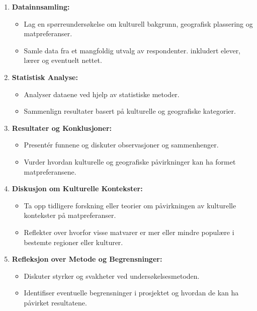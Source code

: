 \documentclass{article}
\begin{document}
\begin{enumerate}[label=\arabic*.]
  \item \textbf{Datainnsamling:}
  \begin{itemize}
    \item Lag en spørreundersøkelse om kulturell bakgrunn, geografisk plassering og matpreferanser.
    \item Samle data fra et mangfoldig utvalg av respondenter. inkludert elever, lærer og eventuelt nettet.
  \end{itemize}
  
  \item \textbf{Statistisk Analyse:}
  \begin{itemize}
    \item Analyser dataene ved hjelp av statistiske metoder.
    \item Sammenlign resultater basert på kulturelle og geografiske kategorier.
  \end{itemize}
  
  \item \textbf{Resultater og Konklusjoner:}
  \begin{itemize}
    \item Presentér funnene og diskuter observasjoner og sammenhenger.
    \item Vurder hvordan kulturelle og geografiske påvirkninger kan ha formet matpreferansene.
  \end{itemize}
  
  \item \textbf{Diskusjon om Kulturelle Kontekster:}
  \begin{itemize}
    \item Ta opp tidligere forskning eller teorier om påvirkningen av kulturelle kontekster på matpreferanser.
    \item Reflekter over hvorfor visse matvarer er mer eller mindre populære i bestemte regioner eller kulturer.
  \end{itemize}
  
  \item \textbf{Refleksjon over Metode og Begrensninger:}
  \begin{itemize}
    \item Diskuter styrker og svakheter ved undersøkelsesmetoden.
    \item Identifiser eventuelle begrensninger i prosjektet og hvordan de kan ha påvirket resultatene.
  \end{itemize}
\end{enumerate}
\end{document}
